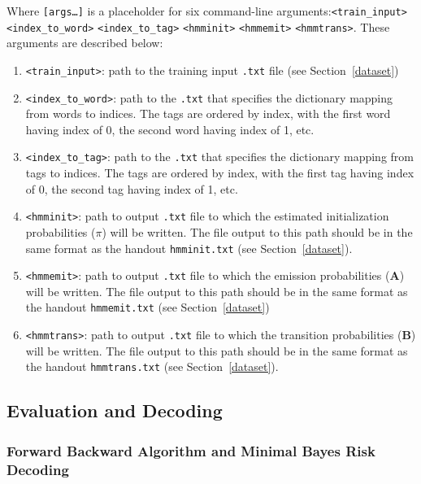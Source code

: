 \documentclass[11pt,addpoints,answers]{exam}
\begin{document}
Where \texttt{[args\dots]} is a placeholder for six command-line arguments:\texttt{<train\_input>} \texttt{<index\_to\_word>} \texttt{<index\_to\_tag>} \texttt{<hmminit>} \texttt{<hmmemit>} \texttt{<hmmtrans>}. These arguments are described below:
\begin{enumerate}
    \item \texttt{<train\_input>}: path to the training input \texttt{.txt} file (see Section~\ref{dataset})
    \item \texttt{<index\_to\_word>}: path to the \texttt{.txt} that specifies the dictionary mapping from words to indices. The tags are ordered by index, with the first word having index of 0, the second word having index of 1, etc.
    \item \texttt{<index\_to\_tag>}: path to the \texttt{.txt} that specifies the dictionary mapping from tags to indices. The tags are ordered by index, with the first tag having index of 0, the second tag having index of 1, etc.
    \item \texttt{<hmminit>}: path to output \texttt{.txt} file to which the estimated initialization probabilities (\boldmath${\pi}$) will be written. The file output to this path should be in the same format as the handout \texttt{hmminit.txt} (see Section~\ref{dataset}).
    \item \texttt{<hmmemit>}: path to output \texttt{.txt} file to which the emission probabilities ($\mathbf A$) will be written. The file output to this path should be in the same format as the handout \texttt{hmmemit.txt} (see Section~\ref{dataset})
    \item \texttt{<hmmtrans>}: path to output \texttt{.txt} file to which the transition probabilities ($\mathbf B$) will be written. The file output to this path should be in the same format as the handout \texttt{hmmtrans.txt} (see Section~\ref{dataset}).
\end{enumerate}

\newpage

\subsection{Evaluation and Decoding}
\label{forback}

\subsubsection{Forward Backward Algorithm and Minimal Bayes Risk Decoding}
\end{document}
